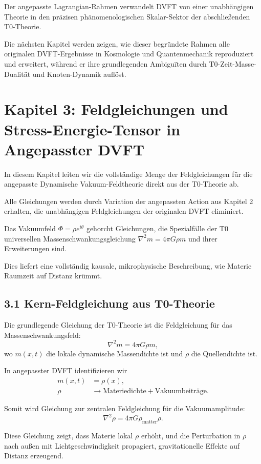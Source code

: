 	Der angepasste Lagrangian-Rahmen verwandelt DVFT von einer unabhängigen Theorie in den präzisen phänomenologischen Skalar-Sektor der abschließenden T0-Theorie.
	
	Die nächsten Kapitel werden zeigen, wie dieser begründete Rahmen alle originalen DVFT-Ergebnisse in Kosmologie und Quantenmechanik reproduziert und erweitert, während er ihre grundlegenden Ambiguïten durch T0-Zeit-Masse-Dualität und Knoten-Dynamik auflöst.
	
	\section{Kapitel 3: Feldgleichungen und Stress-Energie-Tensor in Angepasster DVFT}
	
	In diesem Kapitel leiten wir die vollständige Menge der Feldgleichungen für die angepasste Dynamische Vakuum-Feldtheorie direkt aus der T0-Theorie ab.
	
	Alle Gleichungen werden durch Variation der angepassten Action aus Kapitel 2 erhalten, die unabhängigen Feldgleichungen der originalen DVFT eliminiert.
	
	Das Vakuumfeld $\Phi = \rho e^{i\theta}$ gehorcht Gleichungen, die Spezialfälle der T0 universellen Massenschwankungsgleichung $\nabla^2 m = 4\pi G \rho m$ und ihrer Erweiterungen sind.
	
	Dies liefert eine vollständig kausale, mikrophysische Beschreibung, wie Materie Raumzeit auf Distanz krümmt.
	
	\subsection{3.1 Kern-Feldgleichung aus T0-Theorie}
	
	Die grundlegende Gleichung der T0-Theorie ist die Feldgleichung für das Massenschwankungsfeld:
	\[
	\nabla^2 m = 4\pi G \rho m,
	\]
	wo $m(x,t)$ die lokale dynamische Massendichte ist und $\rho$ die Quellendichte ist.
	
	In angepasster DVFT identifizieren wir
	\begin{align}
		m(x,t) &= \rho(x), \\
		\rho &\to \text{Materiedichte} + \text{Vakuumbeiträge}.
	\end{align}
	
	Somit wird Gleichung zur zentralen Feldgleichung für die Vakuumamplitude:
	\[
	\nabla^2 \rho = 4\pi G \rho_{\text{matter}} \rho.
	\]
	
	Diese Gleichung zeigt, dass Materie lokal $\rho$ erhöht, und die Perturbation in $\rho$ nach außen mit Lichtgeschwindigkeit propagiert, gravitationelle Effekte auf Distanz erzeugend.
	
